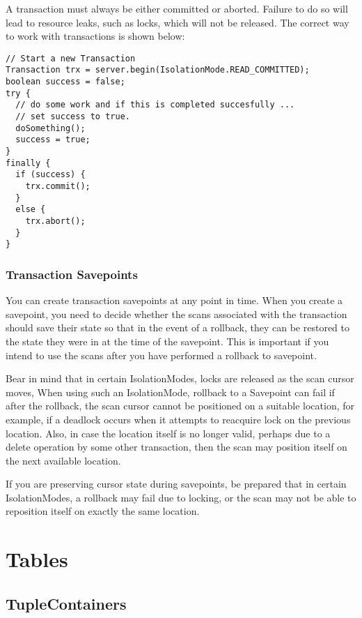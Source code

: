 \documentclass[a4paper,draft,oneside]{book}
\begin{document}
A transaction must always be either committed or aborted. Failure to
do so will lead to resource leaks, such as locks, which will not be
released.  The correct way to work with transactions is shown below:

\begin{verbatim}
// Start a new Transaction
Transaction trx = server.begin(IsolationMode.READ_COMMITTED);
boolean success = false;
try {
  // do some work and if this is completed succesfully ...
  // set success to true.
  doSomething();
  success = true;
}
finally {
  if (success) {
    trx.commit();
  }
  else {
    trx.abort();
  }
}
\end{verbatim}

\subsection{Transaction Savepoints}

You can create transaction savepoints at any point in time.  When you
create a savepoint, you need to decide whether the scans associated
with the transaction should save their state so that in the event of
a rollback, they can be restored to the state they were in at
the time of the savepoint. This is important if you intend to use the
scans after you have performed a rollback to savepoint.

Bear in mind that in certain IsolationModes, locks are released as the
scan cursor moves, When using such an IsolationMode, rollback to a
Savepoint can fail if after the rollback, the scan cursor cannot be
positioned on a suitable location, for example, if a deadlock occurs when
it attempts to reacquire lock on the previous location. Also, in case
the location itself is no longer valid, perhaps due to a delete
operation by some other transaction, then the scan may position itself
on the next available location.

If you are preserving cursor state during savepoints, be prepared that
in certain IsolationModes, a rollback may fail due to locking, or the
scan may not be able to reposition itself on exactly the same
location.

\chapter{Tables}
\label{sec:tables}

\section{TupleContainers}
\end{document}
